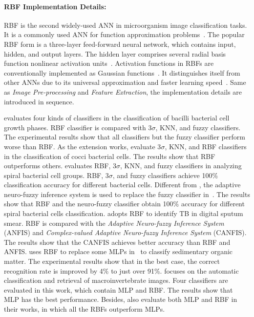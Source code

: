\paragraph{\textbf{RBF Implementation Details:}}
RBF is the second widely-used ANN in microorganism image classification tasks. It is a commonly used ANN for function approximation problems~\cite{Amir-2016-NMS}. The popular RBF form is a three-layer feed-forward neural network, which contains input, hidden, and output layers. The hidden layer comprises several radial basis function nonlinear activation units~\cite{Faris-2017-ERBF}. Activation functions in RBFs are conventionally implemented as Gaussian functions~\cite{Faris-2017-ERBF}. It distinguishes itself from other ANNs due to its universal approximation and faster learning speed~\cite{Amir-2016-NMS}. Same as \emph{Image Pre-processing} and \emph{Feature Extraction}, the implementation details are introduced in sequence.


\cite{Hiremath-2010-AICB} evaluates four kinds of classifiers in the classification of bacilli bacterial cell growth phases. RBF classifier is compared with 3$\sigma$, KNN, and fuzzy classifiers. The experimental results show that all classifiers but the fuzzy classifier perform worse than RBF. As the extension works, \cite{Hiremath-2010-DIAC,Hiremath-2011-ICCB} evaluate 3$\sigma$, KNN, and RBF classifiers in the classification of cocci bacterial cells. The results show that RBF outperforms others. \cite{Hiremath-2011-DMIA} evaluates RBF, 3$\sigma$, KNN, and fuzzy classifiers in analyzing spiral bacterial cell groups. RBF, 3$\sigma$, and fuzzy classifiers achieve 100\% classification accuracy for different bacterial cells. Different from \cite{Hiremath-2011-DMIA}, the adaptive neuro-fuzzy inference system is used to replace the fuzzy classifier in~\cite{Hiremath-2012-SBCI}. The results show that RBF and the neuro-fuzzy classifier obtain 100\% accuracy for different spiral bacterial cells classification. \cite{Priya-2015-AITO} adopts RBF to identify TB in digital sputum smear. RBF is compared with the \emph{Adaptive Neuro-fuzzy Inference System} (ANFIS) and \emph{Complex-valued Adaptive Neuro-fuzzy Inference System} (CANFIS). The results show that the CANFIS achieves better accuracy than RBF and ANFIS. \cite{Weller-2007-TSNN} uses RBF to replace some MLPs in~\cite{Weller-2005-SCSO} to classify sedimentary organic matter. The experimental results show that in the best case, the correct recognition rate is improved by 4\% to just over 91\%. \cite{Kiranyaz-2011-CRMI} focuses on the automatic classification and retrieval of macroinvertebrate images. Four classifiers are evaluated in this work, which contain MLP and RBF. The results show that MLP has the best performance. Besides, \cite{Culverhouse-1996-ACFD,Culverhouse-2000-DAMV,Kruk-2015-CCSI} also evaluate both MLP and RBF in their works, in which all the RBFs outperform MLPs.

